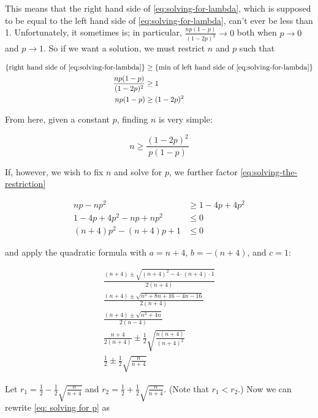 \documentclass{article}
\begin{document}
This means that the right hand side of \eqref{eq:solving-for-lambda}, which is
supposed to be equal to the left hand side of \eqref{eq:solving-for-lambda},
can't ever be less than 1. Unfortunately, it sometimes is; in particular,
$\frac{np(1-p)}{(1-2p)^2} \rightarrow 0$ both when $p \rightarrow 0$ and $p
\rightarrow 1$. So if we want a solution, we must restrict $n$ and $p$ such
that

\begin{align}
  \textnormal{\{right hand side of \eqref{eq:solving-for-lambda}\}} &\geq \textnormal{\{min of left hand side of \eqref{eq:solving-for-lambda}\}} \nonumber \\
  \frac{np(1-p)}{(1-2p)^2} &\geq 1 \nonumber \\
  np(1-p) &\geq (1-2p)^2 \label{eq:solving-the-restriction}
\end{align}

From here, given a constant $p$, finding $n$ is very simple:

\begin{equation}
  n \geq \frac{(1-2p)^2}{p(1-p)} \label{eq: n for a given p}
\end{equation}

If, however, we wish to fix $n$ and solve for $p$, we further factor \eqref{eq:solving-the-restriction}

\begin{align}
  np - np^2 &\geq 1 - 4p + 4p^2 \nonumber \\
  1 - 4p + 4p^2 - np + np^2 &\leq 0 \nonumber \\
  (n+4)p^2 - (n+4)p + 1 &\leq 0 \label{eq: solving for p}
\end{align}

and apply the quadratic formula with $a = n+4$, $b = -(n+4)$, and $c = 1$:

\begin{gather*}
  \frac{(n+4) \pm \sqrt{(n+4)^2 - 4 \cdot (n+4) \cdot 1}}{2(n+4)} \\
  \frac{(n+4) \pm \sqrt{n^2 + 8n + 16 - 4n - 16}}{2(n+4)} \\
  \frac{(n+4) \pm \sqrt{n^2 + 4n}}{2(n-4)} \\
  \frac{n+4}{2(n+4)} \pm \frac12 \sqrt{\frac{n(n+4)}{(n+4)^2}} \\
  \frac12 \pm \frac12 \sqrt{\frac{n}{n+4}}
\end{gather*}

Let $r_1 = \frac12 - \frac12 \sqrt{\frac{n}{n+4}}$ and $r_2 = \frac12 + \frac12
\sqrt{\frac{n}{n+4}}$. (Note that $r_1 < r_2$.) Now we can rewrite \eqref{eq:
solving for p} as
\end{document}
